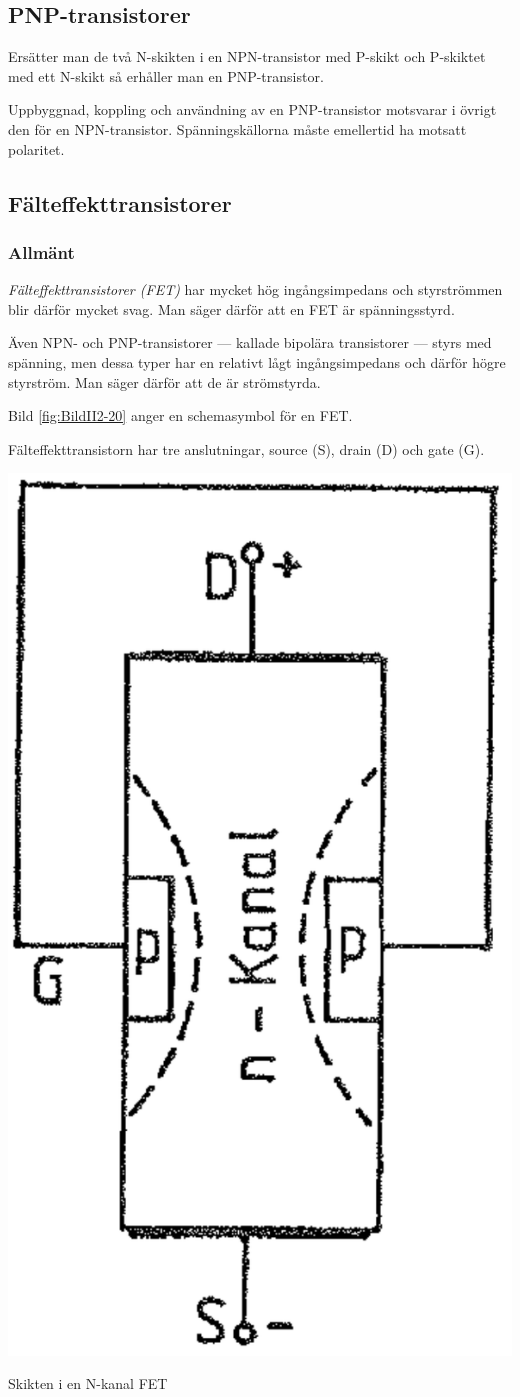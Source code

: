 \subsection{PNP-transistorer}

Ersätter man de två N-skikten i en NPN-transistor med P-skikt och P-skiktet med
ett N-skikt så erhåller man en PNP-transistor.

Uppbyggnad, koppling och användning av en PNP-transistor motsvarar i övrigt den
för en NPN-transistor. Spänningskällorna måste emellertid ha motsatt polaritet.

\subsection{Fälteffekttransistorer}

\subsubsection{Allmänt}

\emph{Fälteffekttransistorer (FET)} har mycket hög ingångsimpedans och styrströmmen blir därför mycket svag.
Man säger därför att en FET är spänningsstyrd.

Även NPN- och PNP-transistorer --- kallade bipolära transistorer ---
styrs med spänning, men dessa typer har en relativt lågt
ingångsimpedans och därför högre styrström. Man säger därför att de är
strömstyrda.

Bild \ref{fig:BildII2-20} anger en schemasymbol för en FET.

Fälteffekttransistorn har tre anslutningar, source (S), drain (D) och
gate (G).

\begin{marginfigure}
\includegraphics[width=.3\textwidth]{images/cropped_pdfs/bild_2_2-21.pdf}
\caption{Skikten i en N-kanal FET}
\label{fig:BildII2-21}
\end{marginfigure}

